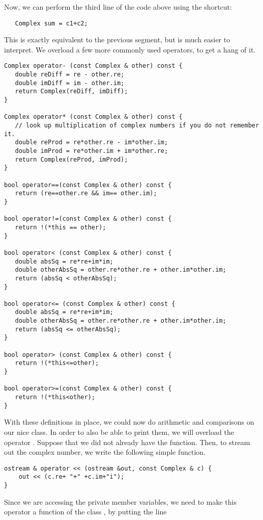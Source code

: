 Now, we can perform the third line of the code above using the
shortcut: 
\begin{verbatim}
   Complex sum = c1+c2;
\end{verbatim}

This is exactly equivalent to the previous segment,
but is much easier to interpret.
We overload a few more commonly used operators, to get a hang of it.

\begin{verbatim}
Complex operator- (const Complex & other) const {
   double reDiff = re - other.re;
   double imDiff = im - other.im;
   return Complex(reDiff, imDiff);
}

Complex operator* (const Complex & other) const {
   // look up multiplication of complex numbers if you do not remember it.
   double reProd = re*other.re - im*other.im;
   double imProd = re*other.im + im*other.re;
   return Complex(reProd, imProd);
}

bool operator==(const Complex & other) const {
   return (re==other.re && im== other.im);
}

bool operator!=(const Complex & other) const {
   return !(*this == other);
}

bool operator< (const Complex & other) const {
   double absSq = re*re+im*im;
   double otherAbsSq = other.re*other.re + other.im*other.im;
   return (absSq < otherAbsSq);
}

bool operator<= (const Complex & other) const {
   double absSq = re*re+im*im;
   double otherAbsSq = other.re*other.re + other.im*other.im;
   return (absSq <= otherAbsSq);
}

bool operator> (const Complex & other) const {
   return !(*this<=other);
}

bool operator>=(const Complex & other) const {
   return !(*this<other);
}
\end{verbatim}

With these definitions in place, we could now do arithmetic and
comparisons on our nice  class. 
In order to also be able to print them,
we will overload the operator \code{<<}.
Suppose that we did not already have the  function.
Then, to stream out the complex number,
we write the following simple function.

\begin{verbatim}
ostream & operator << (ostream &out, const Complex & c) {
    out << (c.re+ "+" +c.im+"i");
}
\end{verbatim}

Since we are accessing the private member variables,
we need to make this operator a  function of the class
, by putting the line

